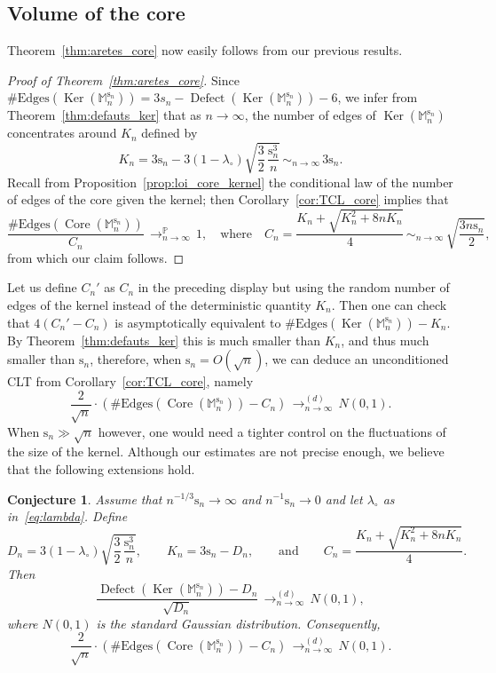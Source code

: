 \documentclass[JEP,XML,SOM,Unicode,NoFloatCountersInSection,NoEqCountersInSection]{cedram}
\theoremstyle{plain}
\newtheorem{conjecture}[theorem]{Conjecture}
\theoremstyle{definition}
\theoremstyle{remark}
\renewcommand{\P}{\mathbb{P}}
\newcommand{\Mapb}{\mathbb{M}}
\newcommand{\spar}{\mathrm{s}}
\DeclareMathOperator{\Core}{Core}
\DeclareMathOperator{\Ker}{Ker}
\DeclareMathOperator{\Defect}{Defect}
\newcommand{\cvloi}[1][n]{\,\mathop{\longrightarrow}^{(d)}_{#1 \to \infty}\,}
\newcommand{\cvproba}[1][n]{\,\mathop{\longrightarrow}^{\P}_{#1 \to \infty}\,}
\newcommand{\equi}[1][n]{\,\mathop{\sim}^{}_{#1 \to \infty}\,}
\begin{document}
\subsection{Volume of the core}
\label{ssec:vol_core}

Theorem~\ref{thm:aretes_core} now easily follows from our previous results.

\begin{proof}[Proof of Theorem~\ref{thm:aretes_core}]
Since $\#\mathrm{Edges} (\Ker(\Mapb_n^{\spar_{n}}))=3s_{n}-\Defect(\Ker(\Mapb_n^{\spar_{n}})) -6$, we infer from Theorem~\ref{thm:defauts_ker} that as $n\to\infty$, the number of edges of $\Ker(\Mapb_n^{\spar_{n}})$ concentrates around $K_{n}$ defined by\vspace*{-3pt}
\[
K_n = 3\spar_n - 3 (1-\lambda_{\circ}) \sqrt{\frac{3}{2}\, \frac{\spar_n^3}{n}} \equi 3\spar_n.
\]
Recall from Proposition~\ref{prop:loi_core_kernel} the conditional law of the number of edges of the core given the kernel; then Corollary~\ref{cor:TCL_core} implies that\vspace*{-3pt}
\[
\frac{\#\mathrm{Edges}(\Core(\Mapb_n^{\spar_{n}}))}{C_n} \cvproba 1,
\quad\text{where}\quad
C_n = \frac{K_n + \sqrt{K_n^{2} + 8 n K_n }}{4}
\equi \sqrt{\frac{3 n \spar_n}{2}},
\]
from which our claim follows.
\end{proof}

Let us define $C_n'$ as $C_n$ in the preceding display but using the random number of edges of the kernel instead of the deterministic quantity $K_n$. Then one can check that $4(C_n' - C_n)$ is asymptotically equivalent to $\#\mathrm{Edges}(\Ker(\Mapb_n^{\spar_{n}}))-K_n$. By Theorem~\ref{thm:defauts_ker} this is much smaller than $K_n$, and thus much smaller than $\spar_n$, therefore, when $\spar_n = O(\sqrt{n})$, we can deduce an unconditioned CLT from Corollary~\ref{cor:TCL_core}, namely
\[
\frac{2}{\sqrt{n}} \cdot \left(\#\mathrm{Edges}(\Core(\Mapb_n^{\spar_{n}})) - C_n \right) \cvloi N(0,1).
\]
When $\spar_n \gg \sqrt{n}$ however, one would need a tighter control on the fluctuations of the size of the kernel.
Although our estimates are not precise enough, we believe that the following extensions hold.

\begin{conjecture}\label{conjecture_TCL}
Assume that $n^{-1/3} \spar_n \to \infty$ and $n^{-1} \spar_n \to 0$ and let $\lambda_\circ$ as in~\eqref{eq:lambda}. Define
\[
D_n = 3 (1-\lambda_{\circ}) \sqrt{\frac{3}{2}\, \frac{\spar_n^3}{n}},
\qquad
K_n = 3\spar_n - D_n,
\qquad\text{and}\qquad
C_n = \frac{K_n + \sqrt{K_n^{2} + 8 n K_n }}{4}.
\]
Then
\[
\frac{\Defect(\Ker(\Mapb_n^{\spar_{n}})) - D_n}{\sqrt{D_n}} \cvloi N(0,1),
\]
where $N(0,1)$ is the standard Gaussian distribution. Consequently,
\[
\frac{2}{\sqrt{n}} \cdot \left(\#\mathrm{Edges}(\Core(\Mapb_n^{\spar_{n}})) - C_n \right) \cvloi N(0,1).
\]
\end{conjecture}
\end{document}
